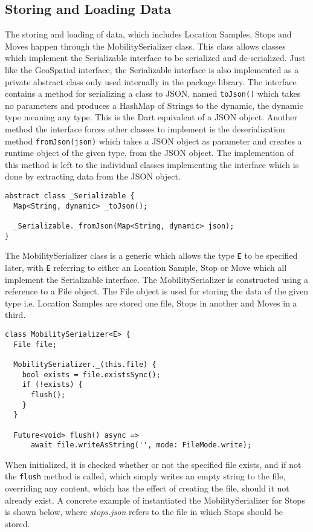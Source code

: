 \subsection{Storing and Loading Data}
The storing and loading of data, which includes Location Samples, Stops and Moves happen through the MobilitySerializer class. This class allows classes which implement the Serializable interface to be serialized and de-serialized. Just like the GeoSpatial interface, the Serializable interface is also implemented as a private abstract class only used internally in the package library. The interface contains a method for serializing a class to JSON, named \verb|toJson()| which takes no parameters and produces a HashMap of Strings to the dynamic, the dynamic type meaning any type. This is the Dart equivalent of a JSON object. Another method the interface forces other classes to implement is the deserialization method \verb|fromJson(json)| which takes a JSON object as parameter and creates a runtime object of the given type, from the JSON object. The implemention of this method is left to the individual classes implementing the interface which is done by extracting data from the JSON object.

\begin{verbatim}
abstract class _Serializable {
  Map<String, dynamic> _toJson();

  _Serializable._fromJson(Map<String, dynamic> json);
}
\end{verbatim}

The MobilitySerializer class is a generic which allows the type \verb|E| to be specified later, with \verb|E| referring to either an Location Sample, Stop or Move which all implement the Serializable interface. The MobilitySerializer is constructed using a reference to a File object. The File object is used for storing the data of the given type i.e. Location Samples are stored one file, Stops in another and Moves in a third.

\begin{verbatim}
class MobilitySerializer<E> {
  File file;
  
  MobilitySerializer._(this.file) {
    bool exists = file.existsSync();
    if (!exists) {
      flush();
    }
  }
  
  Future<void> flush() async =>
      await file.writeAsString('', mode: FileMode.write);
\end{verbatim}

When initialized, it is checked whether or not the specified file exists, and if not the \verb|flush| method is called, which simply writes an empty string to the file, overriding any content, which has the effect of creating the file, should it not already exist. A concrete example of instantiated the MobilitySerializer for Stops is shown below, where \textit{stops.json} refers to the file in which Stops should be stored.

